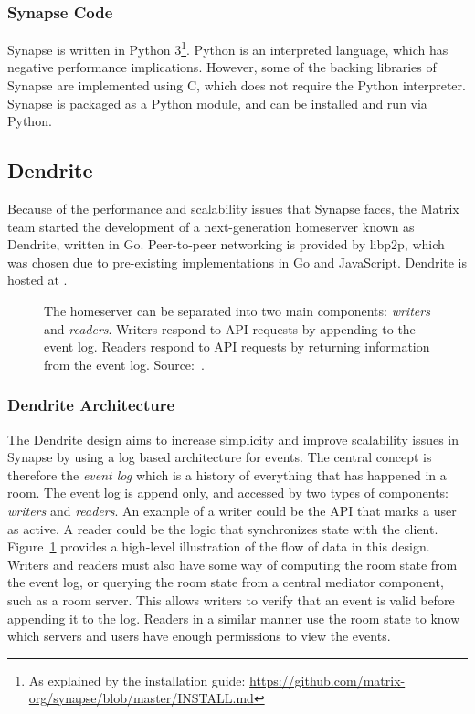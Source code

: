 \subsubsection{Synapse Code}
Synapse is written in Python 3\footnote{As explained by the installation guide: \url{https://github.com/matrix-org/synapse/blob/master/INSTALL.md}}.
Python is an interpreted language, which has negative performance implications.
However, some of the backing libraries of Synapse are implemented using C, which does not require the Python interpreter.
Synapse is packaged as a Python module, and can be installed and run via Python.

\subsection{Dendrite}\label{sec:dendrite}
Because of the performance and scalability issues that Synapse faces, the Matrix team started the development of a next-generation homeserver known as Dendrite, written in Go.
Peer-to-peer networking is provided by libp2p, which was chosen due to pre-existing implementations in Go and JavaScript.
Dendrite is hosted at .

\begin{figure}
	\centering
	\resizebox{!}{!}{}
	\caption{
		The homeserver can be separated into two main components: \textit{writers} and \textit{readers}.
		Writers respond to API requests by appending to the event log.
		Readers respond to API requests by returning information from the event log.
		Source:~\cite{dendrite_design_md}.
	}%
	\label{fig:dendrite_design}
\end{figure}

\subsubsection{Dendrite Architecture}
The Dendrite design aims to increase simplicity and improve scalability issues in Synapse by using a log based architecture for events.
The central concept is therefore the \textit{event log} which is a history of everything that has happened in a room.
The event log is append only, and accessed by two types of components: \textit{writers} and \textit{readers}.
An example of a writer could be the API that marks a user as active.
A reader could be the logic that synchronizes state with the client.
Figure~\ref{fig:dendrite_design} provides a high-level illustration of the flow of data in this design.
Writers and readers must also have some way of computing the room state from the event log, or querying the room state from a central mediator component, such as a room server.
This allows writers to verify that an event is valid before appending it to the log.
Readers in a similar manner use the room state to know which servers and users have enough permissions to view the events.

